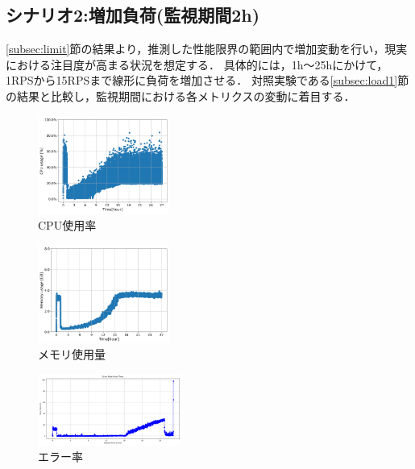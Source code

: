 \documentclass[twoside,twocolumn,10pt]{jarticle}  %
\begin{document}
\subsection{シナリオ2:増加負荷(監視期間2h)}
\label{subsec:load2}

\ref{subsec:limit}節の結果より，推測した性能限界の範囲内で増加変動を行い，現実における注目度が高まる状況を想定する．
具体的には，1h～25hにかけて，1RPSから15RPSまで線形に負荷を増加させる．
対照実験である\ref{subsec:load1}節の結果と比較し，監視期間における各メトリクスの変動に着目する．
\vspace{0.1cm}
\begin{figure}[h]
  \centering
  \includegraphics[width=4.3cm]{figures/8core_1_15rps_increase_cpu.png}
  \vspace{-0.5cm}
  \caption{CPU使用率}
  \label{f1}
\end{figure}
\vspace{-0.5cm}
\begin{figure}[h]
  \centering
  \includegraphics[width=4.3cm]{figures/8core_1_15rps_increase_mem.png}
  \vspace{-0.5cm}
  \caption{メモリ使用量}
  \label{f2}
\end{figure}
\begin{figure}[h]
  \centering
  \includegraphics[width=4.7cm]{figures/8core_1_15rps_error_rate.png}
  \vspace{-0.5cm}
  \caption{エラー率}
  \label{f3}
\end{figure}
\vspace{-0.4cm}
\end{document}
